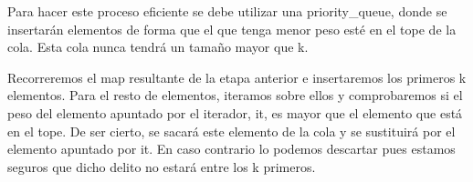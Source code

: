 Para hacer este proceso eficiente se debe utilizar una priority\+\_\+queue, donde se insertarán elementos de forma que el que tenga menor peso esté en el tope de la cola. Esta cola nunca tendrá un tamaño mayor que k.

Recorreremos el map resultante de la etapa anterior e insertaremos los primeros k elementos. Para el resto de elementos, iteramos sobre ellos y comprobaremos si el peso del elemento apuntado por el iterador, it, es mayor que el elemento que está en el tope. De ser cierto, se sacará este elemento de la cola y se sustituirá por el elemento apuntado por it. En caso contrario lo podemos descartar pues estamos seguros que dicho delito no estará entre los k primeros. 